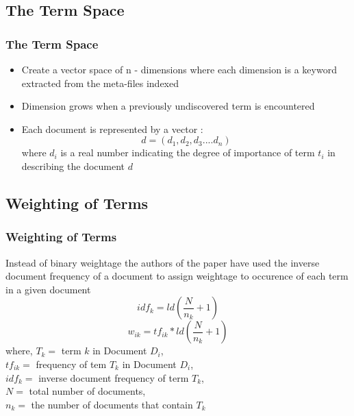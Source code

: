 \documentclass[12pt,xcolor=dvipsnames]{beamer}
\begin{document}
\subsection{The Term Space}
\begin{frame}
\frametitle{The Term Space}
\begin{itemize}
 \item Create a vector space of n - dimensions where each dimension is a keyword extracted from the meta-files indexed
 \item Dimension grows when a previously undiscovered term is encountered
 \item Each document is represented by a vector :
\begin{equation}
d = (d_{1}, d_{2}, d_{3} .... d_{n})
\end{equation}
where $d_{i}$ is a real number indicating the degree of importance of term $t_{i}$ in describing the document $d$
\end{itemize}
\end{frame}

\subsection{Weighting of Terms}
\begin{frame}
 \frametitle{Weighting of Terms}
 Instead of binary weightage the authors of the paper have used the inverse document frequency of a document to assign weightage to occurence of each term in a given document
\begin{equation}
 idf_{k} = ld\left( \frac{N}{n_{k}} + 1\right)
\end{equation}
\begin{equation}
 w_{ik} = tf_{ik} * ld\left( \frac{N}{n_{k}} + 1\right)
\end{equation}
where, $T_{k} = $ term $k$ in Document $D_{i}$, \\
$tf_{ik} = $ frequency of tem $T_{k}$ in Document $D_{i}$, \\
$idf_{k} = $ inverse document frequency of term $T_{k}$, \\
$N = $ total number of documents, \\
$n_{k} = $ the number of documents that contain $T_{k}$ \\
\end{frame}
\end{document}
